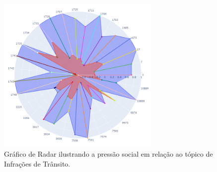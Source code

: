 \begin{figure}[htb]
	\centering
	\includegraphics[width=0.7\textwidth]{images/social_barometer_traffic.png}
	\caption{Gráfico de Radar ilustrando a pressão social em relação ao tópico de Infrações de Trânsito.}
	\label{fig:social_barometer_traffic}
\end{figure}

